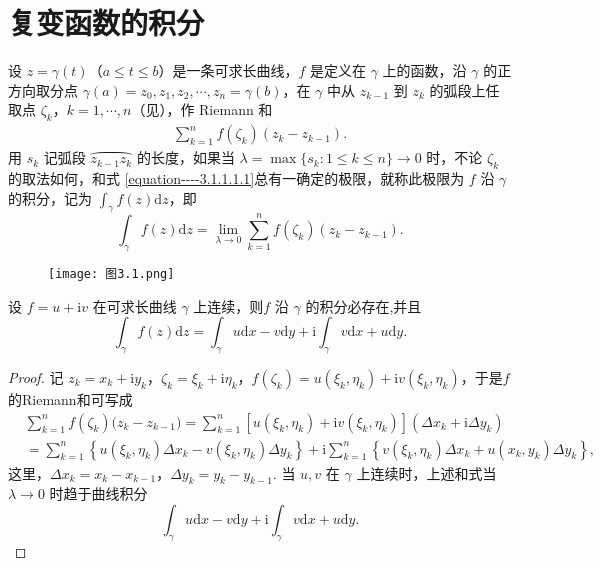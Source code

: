 \documentclass[../../main.tex]{subfiles}
\begin{document}
\section{复变函数的积分}

\begin{definition}
设 \( z = \gamma(t) \)（\( a \leqslant t \leqslant b \)）是一条可求长曲线，\( f \) 是定义在 \( \gamma \) 上的函数，沿 \( \gamma \) 的正方向取分点 \( \gamma(a) = z_0, z_1, z_2, \cdots, z_n = \gamma(b) \)，在 \( \gamma \) 中从 \( z_{k - 1} \) 到 \( z_k \) 的弧段上任取点 \( \zeta_k \)，\( k = 1, \cdots, n \)（见），作 Riemann 和
\begin{align}\label{equation----3.1.1.1.1}
\sum_{k = 1}^n f(\zeta_k)(z_k - z_{k - 1}). 
\end{align}
用 \( s_k \) 记弧段 \( \wideparen{z_{k - 1}z_k} \) 的长度，如果当 \( \lambda = \max\{s_k: 1 \leqslant k \leqslant n\} \to 0 \) 时，不论 \( \zeta_k \) 的取法如何，和式 \eqref{equation----3.1.1.1.1}总有一确定的极限，就称此极限为 \( f \) 沿 \( \gamma \) 的积分，记为 \( \int_\gamma f(z)\mathrm{d}z \)，即
\[
\int_\gamma f(z)\mathrm{d}z = \lim_{\lambda \to 0} \sum_{k = 1}^n f(\zeta_k)(z_k - z_{k - 1}).
\]
\end{definition}

\begin{figure}[H]
\centering
\texttt{[image: 图3.1.png]}
\caption{}
\label{figure:图3.1}
\end{figure}

\begin{proposition}\label{proposition:连续复变函数积分必存在}
设 \( f = u + \mathrm{i}v \) 在可求长曲线 \( \gamma \) 上连续，则\( f \) 沿 \( \gamma \) 的积分必存在,并且
\[
\int_\gamma f(z)\mathrm{d}z = \int_\gamma u \mathrm{d}x - v \mathrm{d}y + \mathrm{i}\int_\gamma v \mathrm{d}x + u \mathrm{d}y.
\]
\end{proposition}
\begin{proof}
记 \( z_k = x_k + \mathrm{i}y_k \)，\( \zeta_k = \xi_k + \mathrm{i}\eta_k \)，\( f(\zeta_k) = u(\xi_k, \eta_k) + \mathrm{i}v(\xi_k, \eta_k) \)，于是$f$的Riemann和可写成
\begin{align*}
&\sum_{k=1}^n{f(\zeta _k)(z_k}-z_{k-1})=\sum_{k=1}^n{\left[ u\left( \xi _k,\eta _k \right) +\mathrm{i}v\left( \xi _k,\eta _k \right) \right] \left( \Delta x_k+\mathrm{i}\Delta y_k \right)}
\\
&=\sum_{k=1}^n{\left\{ u(\xi _k,\eta _k)\Delta x_k-v(\xi _k,\eta _k)\Delta y_k \right\}}+\mathrm{i}\sum_{k=1}^n{\left\{ v(\xi _k,\eta _k)\Delta x_k+u(x_k,y_k)\Delta y_k \right\}},
\end{align*}
这里，\( \Delta x_k = x_k - x_{k - 1} \)，\( \Delta y_k = y_k - y_{k - 1} \). 当 \( u, v \) 在 \( \gamma \) 上连续时，上述和式当 \( \lambda \to 0 \) 时趋于曲线积分
\[
\int_\gamma u \mathrm{d}x - v \mathrm{d}y + \mathrm{i}\int_\gamma v \mathrm{d}x + u \mathrm{d}y.
\]
\end{proof}
\end{document}
